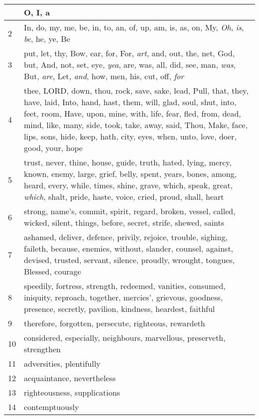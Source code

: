 \begin{longtable}{l|p{3.75in}}
\hline \hline
\endlastfoot
1 & O, I, a \\ \hline
2 & In, do, my, me, be, in, to, an, of, up, am, is, as, on, My, \emph{Oh}, \emph{is}, \emph{be}, he, ye, Be \\ \hline
3 & put, let, thy, Bow, ear, for, For, \emph{art}, and, out, the, net, God, but, And, not, set, eye, \emph{yea}, are, was, all, did, see, man, \emph{was}, But, \emph{are}, Let, \emph{and}, how, men, his, cut, off, \emph{for} \\ \hline
4 & thee, LORD, down, thou, rock, save, sake, lead, Pull, that, they, have, laid, Into, hand, hast, them, will, glad, soul, shut, into, feet, room, Have, upon, mine, with, life, fear, fled, from, dead, mind, like, many, side, took, take, away, said, Thou, Make, face, lips, sons, hide, keep, hath, city, eyes, when, unto, love, doer, good, your, hope \\ \hline
5 & trust, never, thine, house, guide, truth, hated, lying, mercy, known, enemy, large, grief, belly, spent, years, bones, among, heard, every, while, times, shine, grave, which, speak, great, \emph{which}, shalt, pride, haste, voice, cried, proud, shall, heart \\ \hline
6 & strong, name's, commit, spirit, regard, broken, vessel, called, wicked, silent, things, before, secret, strife, shewed, saints \\ \hline
7 & ashamed, deliver, defence, privily, rejoice, trouble, sighing, faileth, because, enemies, without, slander, counsel, against, devised, trusted, servant, silence, proudly, wrought, tongues, Blessed, courage \\ \hline
8 & speedily, fortress, strength, redeemed, vanities, consumed, iniquity, reproach, together, mercies', grievous, goodness, presence, secretly, pavilion, kindness, heardest, faithful \\ \hline
9 & therefore, forgotten, persecute, righteous, rewardeth \\ \hline
10 & considered, especially, neighbours, marvellous, preserveth, strengthen \\ \hline
11 & adversities, plentifully \\ \hline
12 & acquaintance, nevertheless \\ \hline
13 & righteousness, supplications \\ \hline
14 & contemptuously \\ \hline
\end{longtable}






